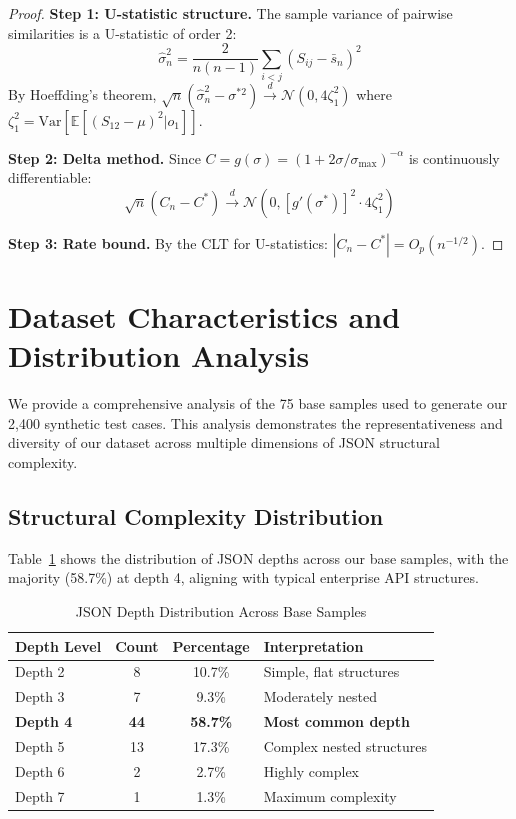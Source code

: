 \documentclass{article}
\begin{document}
\begin{proof}
\textbf{Step 1: U-statistic structure.}
The sample variance of pairwise similarities is a U-statistic of order 2:
\begin{equation}
    \hat{\sigma}^2_n = \frac{2}{n(n-1)} \sum_{i<j} (S_{ij} - \bar{s}_n)^2
\end{equation}
By Hoeffding's theorem, $\sqrt{n}(\hat{\sigma}^2_n - \sigma^{*2}) \xrightarrow{d} \mathcal{N}(0, 4\zeta_1^2)$ where $\zeta_1^2 = \text{Var}[\mathbb{E}[(S_{12} - \mu)^2 | o_1]]$.

\textbf{Step 2: Delta method.}
Since $C = g(\sigma) = (1 + 2\sigma/\sigma_{\max})^{-\alpha}$ is continuously differentiable:
\begin{equation}
    \sqrt{n}(C_n - C^*) \xrightarrow{d} \mathcal{N}(0, [g'(\sigma^*)]^2 \cdot 4\zeta_1^2)
\end{equation}

\textbf{Step 3: Rate bound.}
By the CLT for U-statistics: $|C_n - C^*| = O_p(n^{-1/2})$.
\end{proof}

\section{Dataset Characteristics and Distribution Analysis}
\label{sec:dataset-distribution}

We provide a comprehensive analysis of the 75 base samples used to generate our 2,400 synthetic test cases. This analysis demonstrates the representativeness and diversity of our dataset across multiple dimensions of JSON structural complexity.

\subsection{Structural Complexity Distribution}
\label{subsec:structural-complexity}

Table~\ref{tab:json-depth-appendix} shows the distribution of JSON depths across our base samples, with the majority (58.7\%) at depth 4, aligning with typical enterprise API structures.

\begin{table}[H]
\centering
\caption{JSON Depth Distribution Across Base Samples}
\label{tab:json-depth-appendix}
\begin{tabular}{lccp{5cm}}
\toprule
\textbf{Depth Level} & \textbf{Count} & \textbf{Percentage} & \textbf{Interpretation} \\
\midrule
Depth 2 & 8 & 10.7\% & Simple, flat structures \\
Depth 3 & 7 & 9.3\% & Moderately nested \\
\textbf{Depth 4} & \textbf{44} & \textbf{58.7\%} & \textbf{Most common depth} \\
Depth 5 & 13 & 17.3\% & Complex nested structures \\
Depth 6 & 2 & 2.7\% & Highly complex \\
Depth 7 & 1 & 1.3\% & Maximum complexity \\
\bottomrule
\end{tabular}
\end{table}
\end{document}
